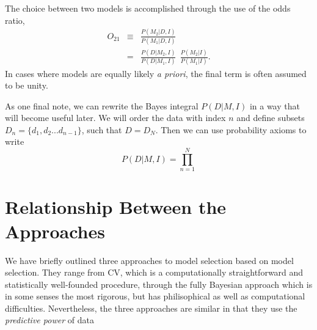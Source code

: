 \documentclass[12pt]{article}
\begin{document}
The choice between two models is accomplished through the use of the odds
ratio,
\begin{eqnarray}
  O_{21} &\equiv& \frac{P(M_2|D,I)}{P(M_1|D,I)}\\
        &=& \frac{P(D|M_2,I)}{P(D|M_1,I)}\ \ \frac{P(M_2|I)}{P(M_1|I)}.
\end{eqnarray}
In cases where models are equally likely {\it a priori}, the final term
is often assumed to be unity.

As one final note, we can rewrite the Bayes integral $P(D|M,I)$ in a way
that will become useful later.  We will order the data with index $n$ and
define subsets $D_{n} = \{d_1, d_2 ... d_{n-1}\}$, such that $D = D_N$.
Then we can use probability axioms to write
\begin{equation}
  P(D|M,I) = \prod_{n=1}^N 
\end{equation}

\section{Relationship Between the Approaches}
We have briefly outlined three approaches to model selection based on model
selection.  They range from CV, which is a computationally straightforward
and statistically well-founded procedure, through the fully Bayesian approach
which is in some senses the most rigorous, but has philisophical as well
as computational difficulties.  Nevertheless, the three approaches are similar
in that they use the {\it predictive power} of data
\end{document}
